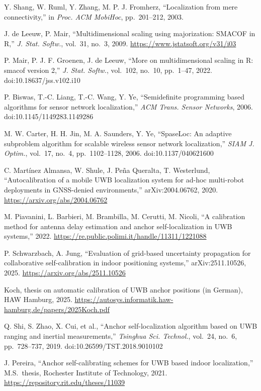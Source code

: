  Y. Shang, W. Ruml, Y. Zhang, M. P. J. Fromherz, ``Localization from mere connectivity,'' in \emph{Proc. ACM MobiHoc}, pp.~201--212, 2003.

 J. de Leeuw, P. Mair, ``Multidimensional scaling using majorization: SMACOF in R,'' \emph{J. Stat. Softw.}, vol.~31, no.~3, 2009. \url{https://www.jstatsoft.org/v31/i03}

 P. Mair, P. J. F. Groenen, J. de Leeuw, ``More on multidimensional scaling in R: smacof version 2,'' \emph{J. Stat. Softw.}, vol.~102, no.~10, pp.~1--47, 2022. doi:10.18637/jss.v102.i10

 P. Biswas, T.-C. Liang, T.-C. Wang, Y. Ye, ``Semidefinite programming based algorithms for sensor network localization,'' \emph{ACM Trans. Sensor Networks}, 2006. doi:10.1145/1149283.1149286

 M. W. Carter, H. H. Jin, M. A. Saunders, Y. Ye, ``SpaseLoc: An adaptive subproblem algorithm for scalable wireless sensor network localization,'' \emph{SIAM J. Optim.}, vol.~17, no.~4, pp.~1102--1128, 2006. doi:10.1137/040621600

 C. Mart\'inez Almansa, W. Shule, J. Pe\~na Queralta, T. Westerlund, ``Autocalibration of a mobile UWB localization system for ad-hoc multi-robot deployments in GNSS-denied environments,'' arXiv:2004.06762, 2020. \url{https://arxiv.org/abs/2004.06762}

 M. Piavanini, L. Barbieri, M. Brambilla, M. Cerutti, M. Nicoli, ``A calibration method for antenna delay estimation and anchor self-localization in UWB systems,'' 2022. \url{https://re.public.polimi.it/handle/11311/1221088}

 P. Schwarzbach, A. Jung, ``Evaluation of grid-based uncertainty propagation for collaborative self-calibration in indoor positioning systems,'' arXiv:2511.10526, 2025. \url{https://arxiv.org/abs/2511.10526}

 Koch, thesis on automatic calibration of UWB anchor positions (in German), HAW Hamburg, 2025. \url{https://autosys.informatik.haw-hamburg.de/papers/2025Koch.pdf}

 Q. Shi, S. Zhao, X. Cui, et al., ``Anchor self-localization algorithm based on UWB ranging and inertial measurements,'' \emph{Tsinghua Sci. Technol.}, vol.~24, no.~6, pp.~728--737, 2019. doi:10.26599/TST.2018.9010102

 J. Pereira, ``Anchor self-calibrating schemes for UWB based indoor localization,'' M.S.\ thesis, Rochester Institute of Technology, 2021. \url{https://repository.rit.edu/theses/11039}


